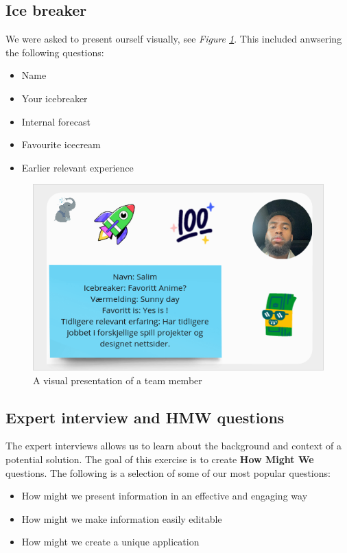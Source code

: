\documentclass[12pt]{article}
\begin{document}
\subsection{Ice breaker}
We were asked to present ourself visually, see \textit{Figure \ref{fig:IB}}.
This included anwsering the following questions:
\begin{itemize}
    \item Name
    \item Your icebreaker
    \item Internal forecast
    \item Favourite icecream
    \item Earlier relevant experience
\end{itemize}
\begin{figure}[h]
    \begin{adjustwidth}{-1in}{-1in}
        \centering
        \includegraphics[scale=1]{icebreaker.png}
        \caption{A visual presentation of a team member}
        \label{fig:IB}
    \end{adjustwidth}
\end{figure}
\clearpage
\subsection{Expert interview and HMW\cite{WhatHowMight} questions}
The expert interviews allows us to learn about the background and context of a potential solution.
The goal of this exercise is to create \textbf{How Might We} questions.
The following is a selection of some of our most popular questions:
\begin{itemize}
    \item How might we present information in an effective and engaging way
    \item How might we make information easily editable
    \item How might we create a unique application
\end{itemize}
\end{document}

